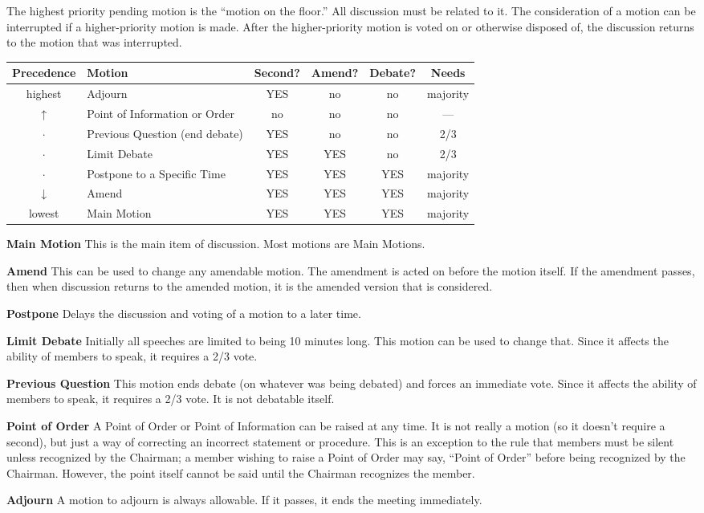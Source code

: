 The highest priority pending motion is the ``motion on the floor.''
All discussion must be related to it.  The consideration of a motion
can be interrupted if a higher-priority motion is made.  After the
higher-priority motion is voted on or otherwise disposed of, the
discussion returns to the motion that was interrupted.

\bigskip
\begin{tabular}{c|l|c|c|c|c}
Precedence & Motion & Second? & Amend? & Debate? & Needs \\ \hline
highest & Adjourn & YES & no & no & majority \\
$\uparrow$ & Point of Information or Order & no & no & no & --- \\
$\cdot$ & Previous Question (end debate) & YES & no & no & 2/3 \\
$\cdot$ & Limit Debate & YES & YES & no & 2/3 \\
$\cdot$ & Postpone to a Specific Time & YES & YES & YES & majority \\
$\downarrow$ & Amend & YES & YES & YES & majority \\
lowest & Main Motion & YES & YES & YES & majority
\end{tabular}

\begin{list}{}{}
\item[{\bf Main Motion}]
This is the main item of discussion.  Most motions are Main Motions.
\item[{\bf Amend}]
This can be used to change any amendable motion.  The amendment is acted on
before the motion itself.  If the amendment passes, then when
discussion returns to the amended motion, it is the amended version
that is considered.
\item[{\bf Postpone}]
Delays the discussion and voting of a motion to a later time.
\item[{\bf Limit Debate}]
Initially all speeches are limited to being 10 minutes long.  This
motion can be used to change that.  Since it affects the ability of
members to speak, it requires a 2/3 vote.
\item[{\bf Previous Question}]
This motion ends debate (on whatever was being debated) and forces an
immediate vote.  Since it affects the ability of members to speak, it
requires a 2/3 vote.  It is not debatable itself.
\item[{\bf Point of Order}]
A Point of Order or Point of Information can be raised at any time.
It is not really a motion (so it doesn't require a second), but just a way of
correcting an incorrect statement or procedure.  This is an exception
to the rule that members must be silent unless recognized by the
Chairman; a member wishing to raise a Point of Order may say, ``Point
of Order'' before being recognized by the Chairman.  However, the point
itself cannot be said until the Chairman recognizes the member.
\item[{\bf Adjourn}]
A motion to adjourn is always allowable.  If it passes, it ends the
meeting immediately.
\end{list}


